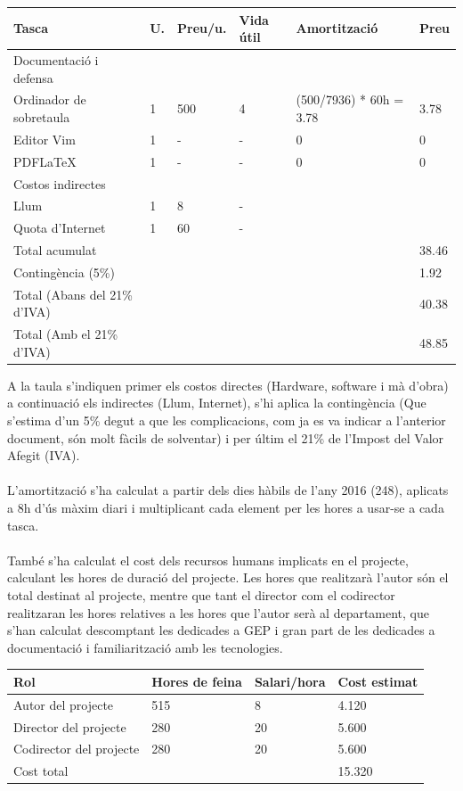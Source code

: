 \documentclass[11pt]{article}
\begin{document}
\begin{center}
\begin{tabular}{| l | l | l | l | l | l |}
		Tasca & U. & Preu/u. & Vida útil & Amortització & Preu \\ \hline
		Documentació i defensa & & & & & \\ \hline
		Ordinador de sobretaula & 1 & 500 & 4 & (500/7936) * 60h = 3.78 & 3.78 \\ \hline
		Editor Vim & 1 & - & - & 0 & 0 \\ \hline
		PDFLaTeX & 1 & - & - & 0 & 0 \\ \hline
		Costos indirectes & & & & & \\ \hline
		Llum & 1 & 8 & - & & \\ \hline
		Quota d'Internet & 1 & 60 & - & & \\ \hline
		Total acumulat & & & & & 38.46 \\ \hline
		Contingència (5\%) & & & & & 1.92 \\ \hline
		Total (Abans del 21\% d'IVA) & & & & & 40.38 \\ \hline
		Total (Amb el 21\% d'IVA) & & & & & 48.85 \\ \hline
		\hline
	\end{tabular}
\end{center}
A la taula s’indiquen primer els costos directes (Hardware, software i mà d’obra) a continuació els indirectes (Llum, Internet), s’hi aplica la contingència (Que s’estima d’un 5\% degut a que les complicacions, com ja es va indicar a l’anterior document, són molt fàcils de solventar) i per últim el 21\% de l’Impost del Valor Afegit (IVA). \\
\\
L’amortització s’ha calculat a partir dels dies hàbils de l’any 2016 (248), aplicats a 8h d’ús màxim diari i multiplicant cada element per les hores a usar-se a cada tasca.\\
\\
També s’ha calculat el cost dels recursos humans implicats en el projecte, calculant les hores de duració del projecte. Les hores que realitzarà l’autor són el total destinat al projecte, mentre que tant el director com el codirector realitzaran les hores relatives a les hores que l’autor serà al departament, que s’han calculat descomptant les dedicades a GEP i gran part de les dedicades a documentació i familiarització amb les tecnologies.
\begin{center}
	\begin{tabular}{| l | l | l | l |}
		\hline
		Rol & Hores de feina & Salari/hora & Cost estimat \\ \hline
		Autor del projecte & 515 & 8 & 4.120 \\ \hline
		Director del projecte & 280 & 20 & 5.600 \\ \hline
		Codirector del projecte & 280 & 20 & 5.600 \\ \hline
		Cost total & & & 15.320 \\ \hline
		\hline
	\end{tabular}
\end{center}
\end{document}
